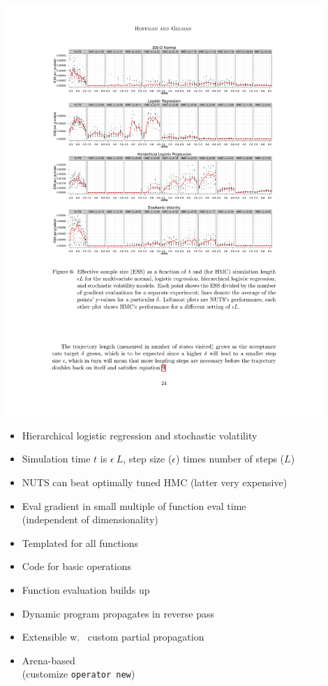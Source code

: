 \documentclass[10pt]{report}
\newcommand{\sld}[1]{\newpage{\noindent\LARGE \ \ \
    \textcolor{MidnightBlue}{\bfseries #1}}\vspace*{4pt}}
\newcommand{\code}[1]{{\tt #1}}
\newcommand{\myemph}[1]{{\color{MidnightBlue}{\bfseries #1}}}
\begin{document}
\includegraphics[width=0.9\textwidth]{img/nuts-ess-2.pdf}

{\small
  \begin{itemize}
  \item Hierarchical logistic regression and stochastic volatility
  \item Simulation time $t$ is $\epsilon \ L$, step size ($\epsilon$)
    times number of steps ($L$)
  \item NUTS can beat optimally tuned HMC (latter very expensive)
  \end{itemize}
}


\sld{Reverse-Mode Auto Diff}
\begin{itemize}
\item Eval gradient in small multiple of function eval time
  \\
  {\footnotesize (independent of dimensionality)}
\item Templated \myemph{C++ overload} for all functions
\item Code \myemph{partial derivatives} for basic operations
\item Function evaluation builds up \myemph{expression tree}
\item Dynamic program propagates \myemph{chain rule} in reverse pass
\item Extensible w.\ \myemph{object-oriented} custom partial propagation
\item Arena-based \myemph{memory management}
  \\ {\footnotesize (customize \code{operator new})}
\end{itemize}
\end{document}
